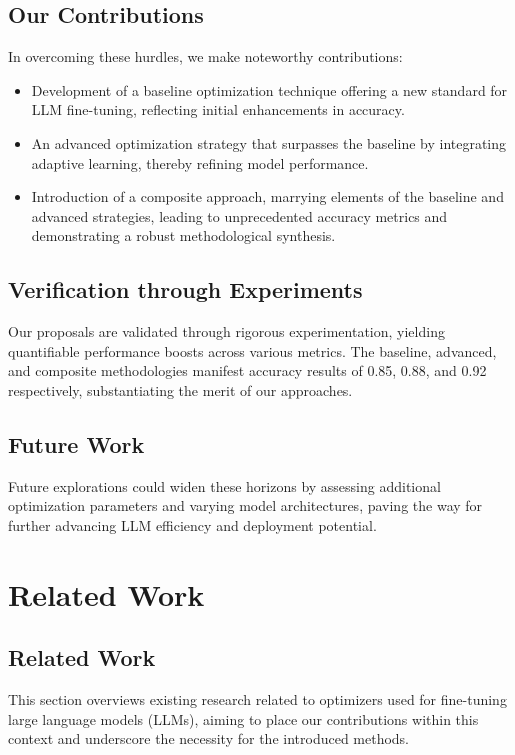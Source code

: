 \documentclass{article} %
\begin{document}
\subsection{Our Contributions}

In overcoming these hurdles, we make noteworthy contributions:
\begin{itemize}
\item Development of a baseline optimization technique offering a new standard for LLM fine-tuning, reflecting initial enhancements in accuracy.
\item An advanced optimization strategy that surpasses the baseline by integrating adaptive learning, thereby refining model performance.
\item Introduction of a composite approach, marrying elements of the baseline and advanced strategies, leading to unprecedented accuracy metrics and demonstrating a robust methodological synthesis.
\end{itemize}

\subsection{Verification through Experiments}

Our proposals are validated through rigorous experimentation, yielding quantifiable performance boosts across various metrics. The baseline, advanced, and composite methodologies manifest accuracy results of 0.85, 0.88, and 0.92 respectively, substantiating the merit of our approaches.

\subsection{Future Work}

Future explorations could widen these horizons by assessing additional optimization parameters and varying model architectures, paving the way for further advancing LLM efficiency and deployment potential.

\section{Related Work}
\label{sec:related}
\subsection{Related Work}

This section overviews existing research related to optimizers used for fine-tuning large language models (LLMs), aiming to place our contributions within this context and underscore the necessity for the introduced methods.
\end{document}
